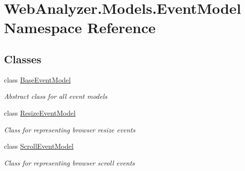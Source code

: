 \hypertarget{namespace_web_analyzer_1_1_models_1_1_event_model}{}\section{Web\+Analyzer.\+Models.\+Event\+Model Namespace Reference}
\label{namespace_web_analyzer_1_1_models_1_1_event_model}
\subsection*{Classes}
\begin{DoxyCompactItemize}
\item 
class \hyperlink{class_web_analyzer_1_1_models_1_1_event_model_1_1_base_event_model}{Base\+Event\+Model}
\begin{DoxyCompactList}\small\item\em Abstract class for all event models \end{DoxyCompactList}\item 
class \hyperlink{class_web_analyzer_1_1_models_1_1_event_model_1_1_resize_event_model}{Resize\+Event\+Model}
\begin{DoxyCompactList}\small\item\em Class for representing browser resize events \end{DoxyCompactList}\item 
class \hyperlink{class_web_analyzer_1_1_models_1_1_event_model_1_1_scroll_event_model}{Scroll\+Event\+Model}
\begin{DoxyCompactList}\small\item\em Class for representing browser scroll events \end{DoxyCompactList}\end{DoxyCompactItemize}
